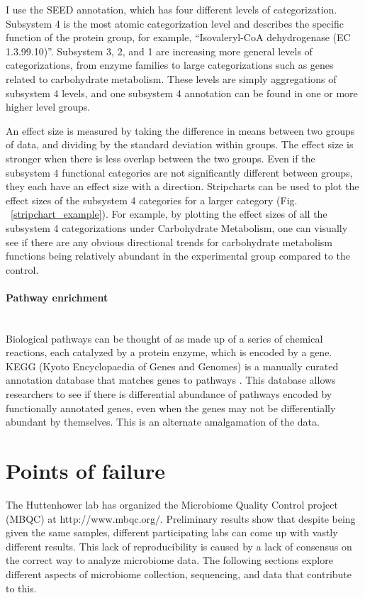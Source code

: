 I use the SEED annotation, which has four different levels of categorization. Subsystem 4 is the most atomic categorization level and describes the specific function of the protein group, for example, “Isovaleryl-CoA dehydrogenase (EC 1.3.99.10)”. Subsystem 3, 2, and 1 are increasing more general levels of categorizations, from enzyme families to large categorizations such as genes related to carbohydrate metabolism. These levels are simply aggregations of subsystem 4 levels, and one subsystem 4 annotation can be found in one or more higher level groups.

An effect size is measured by taking the difference in means between two groups of data, and dividing by the standard deviation within groups. The effect size is stronger when there is less overlap between the two groups. Even if the subsystem 4 functional categories are not significantly different between groups, they each have an effect size with a direction. Stripcharts can be used to plot the effect sizes of the subsystem 4 categories for a larger category (Fig. ~\ref{stripchart_example}). For example, by plotting the effect sizes of all the subsystem 4 categorizations under Carbohydrate Metabolism, one can visually see if there are any obvious directional trends for carbohydrate metabolism functions being relatively abundant in the experimental group compared to the control.

\FloatBarrier

\paragraph{Pathway enrichment}\mbox{}\\
Biological pathways can be thought of as made up of a series of chemical reactions, each catalyzed by a protein enzyme, which is encoded by a gene. KEGG (Kyoto Encyclopaedia of Genes and Genomes) is a manually curated annotation database that matches genes to pathways \cite{kanehisa2000kegg}. This database allows researchers to see if there is differential abundance of pathways encoded by functionally annotated genes, even when the genes may not be differentially abundant by themselves. This is an alternate amalgamation of the data.

\section{Points of failure}
The Huttenhower lab has organized the Microbiome Quality Control project (MBQC) at http://www.mbqc.org/. Preliminary results show that despite being given the same samples, different participating labs can come up with vastly different results. This lack of reproducibility is caused by a lack of consensus on the correct way to analyze microbiome data. The following sections explore different aspects of microbiome collection, sequencing, and data that contribute to this.

